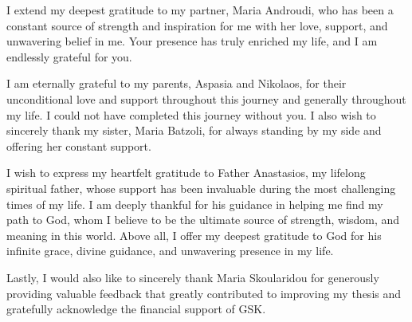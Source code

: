 \begin{acknowledgements}
I extend my deepest gratitude to my partner, Maria Androudi, who has been a constant source of strength and inspiration for me with her love, support, and unwavering belief in me. Your presence has truly enriched my life, and I am endlessly grateful for you.

I am eternally grateful to my parents, Aspasia and Nikolaos, for their unconditional love and support throughout this journey and generally throughout my life. I could not have completed this journey without you. I also wish to sincerely thank my sister, Maria Batzoli, for always standing by my side and offering her constant support.

I wish to express my heartfelt gratitude to Father Anastasios, my lifelong spiritual father, whose support has been invaluable during the most challenging times of my life. I am deeply thankful for his guidance in helping me find my path to God, whom I believe to be the ultimate source of strength, wisdom, and meaning in this world. Above all, I offer my deepest gratitude to God for his infinite grace, divine guidance, and unwavering presence in my life.

Lastly, I would also like to sincerely thank Maria Skoularidou for generously providing valuable feedback that greatly contributed to improving my thesis and gratefully acknowledge the financial support of GSK.

\end{acknowledgements}

